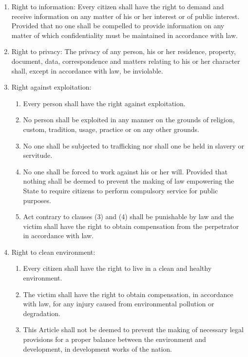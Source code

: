 \begin{questions}
\begin{solution}
\begin{enumerate}
\item Right to information: Every citizen shall have the right to demand and receive information on any matter of his or her interest or of public interest. Provided that no one shall be compelled to provide information on any matter of which confidentiality must be maintained in accordance with law.
\item Right to privacy: The privacy of any person, his or her residence, property, document, data, correspondence and matters relating to his or her character shall, except in accordance with law, be inviolable.
\item Right against exploitation:
\begin{enumerate}
    \item Every person shall have the right against exploitation.
    \item No person shall be exploited in any manner on the grounds of religion, custom, tradition, usage, practice or on any other grounds.
    \item No one shall be subjected to trafficking nor shall one be held in slavery or servitude.
    \item No one shall be forced to work against his or her will. Provided that nothing shall be deemed to prevent the making of law empowering the State to require citizens to perform compulsory service for public purposes.
    \item Act contrary to clauses (3) and (4) shall be punishable by law and the victim shall have the right to obtain compensation from the perpetrator in accordance with law.
\end{enumerate}

\item Right to clean environment:
\begin{enumerate}
    \item Every citizen shall have the right to live in a clean and healthy environment.
    \item The victim shall have the right to obtain compensation, in accordance with law, for any injury caused from environmental pollution or degradation.
    \item This Article shall not be deemed to prevent the making of necessary legal provisions for a proper balance between the environment and development, in development works of the nation.
\end{enumerate}


\end{enumerate}
\end{solution}
\end{questions}
